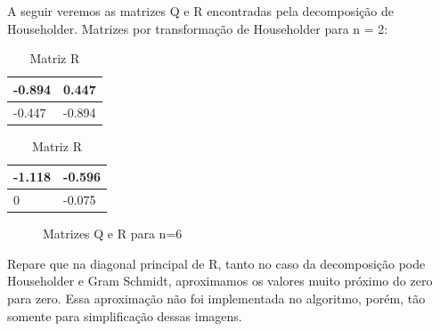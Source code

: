 \documentclass[12pt, a4paper]{article}
\begin{document}
\newpage
A seguir veremos as matrizes Q e R encontradas pela decomposição de Householder.
Matrizes por transformação de Householder para n = 2:

\begin{table}[!htbp]
    \centering
\begin{minipage}[t]{0.48\linewidth}\centering
\caption{Matriz Q}
\begin{tabular}{|l|l| }
\hline
-0.894 & 0.447 \\
\hline
-0.447 & -0.894 \\
\hline
\end{tabular}
\end{minipage}\hfill%
\begin{minipage}[t]{0.48\linewidth}\centering
\caption{Matriz R}
\label{tab:The parameters 2 }
\begin{tabular}{|l|l|}
\hline
-1.118 & -0.596 \\
\hline
0 & -0.075\\
\hline
\end{tabular}
\end{minipage}
\end{table}

\begin{figure}[!htbp]
    \centering    {}
    \qquad
    \caption{Matrizes Q e R para n=6}
    \label{fig:example}
\end{figure}
Repare que na diagonal principal de R, tanto no caso da decomposição pode Householder e Gram Schmidt, aproximamos os valores muito próximo do zero para zero. Essa aproximação não foi implementada no algoritmo, porém, tão somente para simplificação dessas imagens.
\end{document}
